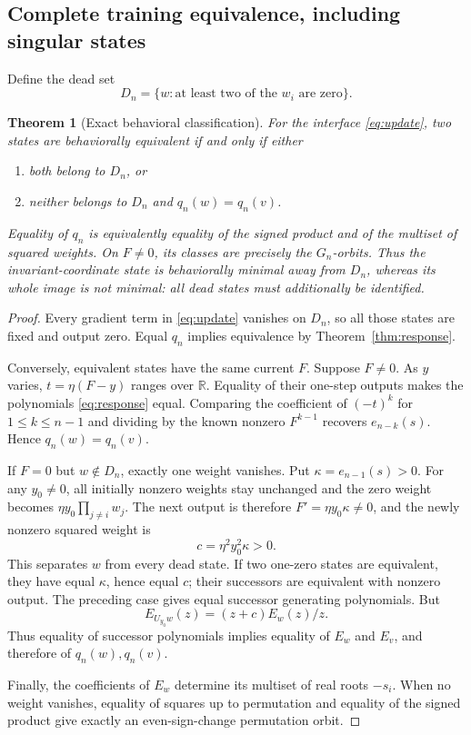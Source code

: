 \documentclass[11pt]{article}
\newtheorem{theorem}{Theorem}[section]
\theoremstyle{definition}\newtheorem{definition}[theorem]{Definition}
\theoremstyle{remark}\newtheorem{remark}[theorem]{Remark}
\newcommand{\R}{\mathbb R}
\begin{document}
\subsection{Complete training equivalence, including singular states}
Define the dead set
\[
 D_n=\{w:\text{at least two of the }w_i\text{ are zero}\}.
\]
\begin{theorem}[Exact behavioral classification]\label{thm:classification}
For the interface \eqref{eq:update}, two states are behaviorally equivalent if and only if either
\begin{enumerate}[label=(\roman*)]
\item both belong to $D_n$, or
\item neither belongs to $D_n$ and $q_n(w)=q_n(v)$.
\end{enumerate}
Equality of $q_n$ is equivalently equality of the signed product and of the multiset of squared weights. On $F\ne0$, its classes are precisely the $G_n$-orbits. Thus the invariant-coordinate state is behaviorally minimal away from $D_n$, whereas its whole image is not minimal: all dead states must additionally be identified.
\end{theorem}
\begin{proof}
Every gradient term in \eqref{eq:update} vanishes on $D_n$, so all those states are fixed and output zero. Equal $q_n$ implies equivalence by Theorem~\ref{thm:response}.

Conversely, equivalent states have the same current $F$. Suppose $F\ne0$. As $y$ varies, $t=\eta(F-y)$ ranges over $\R$. Equality of their one-step outputs makes the polynomials \eqref{eq:response} equal. Comparing the coefficient of $(-t)^k$ for $1\le k\le n-1$ and dividing by the known nonzero $F^{k-1}$ recovers $e_{n-k}(s)$. Hence $q_n(w)=q_n(v)$.

If $F=0$ but $w\notin D_n$, exactly one weight vanishes. Put $\kappa=e_{n-1}(s)>0$. For any $y_0\ne0$, all initially nonzero weights stay unchanged and the zero weight becomes $\eta y_0\prod_{j\ne i}w_j$. The next output is therefore $F'=\eta y_0\kappa\ne0$, and the newly nonzero squared weight is
\[
 c=\eta^2y_0^2\kappa>0.
\]
This separates $w$ from every dead state. If two one-zero states are equivalent, they have equal $\kappa$, hence equal $c$; their successors are equivalent with nonzero output. The preceding case gives equal successor generating polynomials. But
\[
 E_{U_{y_0}w}(z)=(z+c)E_w(z)/z.
\]
Thus equality of successor polynomials implies equality of $E_w$ and $E_v$, and therefore of $q_n(w),q_n(v)$.

Finally, the coefficients of $E_w$ determine its multiset of real roots $-s_i$. When no weight vanishes, equality of squares up to permutation and equality of the signed product give exactly an even-sign-change permutation orbit.
\end{proof}
\end{document}
